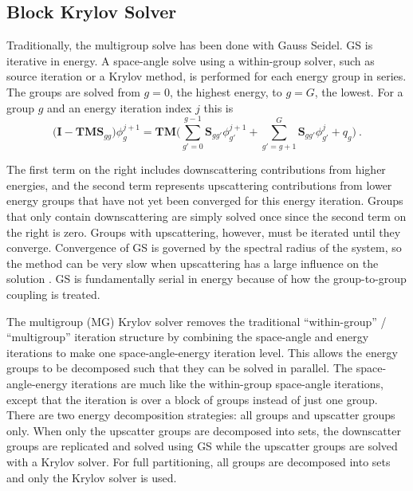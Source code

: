 \documentclass[preprint,12pt]{elsarticle}
\newcommand{\ve}[1]{\ensuremath{\mathbf{#1}}}
\begin{document}
\subsection{Block Krylov Solver}
\label{sec:blockkrylov}
Traditionally, the multigroup solve has been done with Gauss Seidel. GS is iterative in energy. A space-angle solve using a within-group solver, such as source iteration or a Krylov method, is performed for each energy group in series. The groups are solved from $g=0$, the highest energy, to $g=G$, the lowest. For a group $g$ and an energy iteration index $j$ this is \cite{Evans2010}
%
\begin{equation}
  \bigl( \ve{I} - \ve{TMS}_{gg} \bigr) \phi^{j+1}_{g} = \ve{TM} \bigl( \sum_{g'=0}^{g-1}\ve{S}_{gg'}\phi^{j+1}_{g'} + \sum_{g'=g+1}^{G} \ve{S}_{gg'}\phi^{j}_{g'}  + q_{g} \bigr)  \:.
 \label{eq:up-GS}
\end{equation}

The first term on the right includes downscattering contributions from higher energies, and the second term represents upscattering contributions from lower energy groups that have not yet been converged for this energy iteration. Groups that only contain downscattering are simply solved once since the second term on the right is zero. Groups with upscattering, however, must be iterated until they converge. Convergence of GS is governed by the spectral radius of the system, so the method can be very slow when upscattering has a large influence on the solution \cite{Adams2002}. GS is fundamentally serial in energy because of how the group-to-group coupling is treated. 

The multigroup (MG) Krylov solver removes the traditional ``within-group'' / ``multigroup'' iteration structure by combining the space-angle and energy iterations to make one space-angle-energy iteration level. This allows the energy groups to be decomposed such that they can be solved in parallel. The space-angle-energy iterations are much like the within-group space-angle iterations, except that the iteration is over a block of groups instead of just one group. There are two energy decomposition strategies: all groups and upscatter groups only. When only the upscatter groups are decomposed into sets, the downscatter groups are replicated and solved using GS while the upscatter groups are solved with a Krylov solver. For full partitioning, all groups are decomposed into sets and only the Krylov solver is used. 
\end{document}
